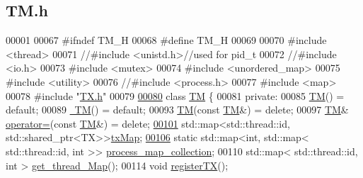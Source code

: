 \hypertarget{_t_m_8h_source}{}\subsection{T\+M.\+h}

\begin{DoxyCode}
00001 
00067 \textcolor{preprocessor}{#ifndef TM\_H}
00068 \textcolor{preprocessor}{#define TM\_H}
00069 
00070 \textcolor{preprocessor}{#include <thread>}
00071 \textcolor{comment}{//#include <unistd.h>//used for pid\_t}
00072 \textcolor{comment}{//#include <io.h>}
00073 \textcolor{preprocessor}{#include <mutex>}
00074 \textcolor{preprocessor}{#include <unordered\_map>}
00075 \textcolor{preprocessor}{#include <utility>}
00076 \textcolor{comment}{//#include <process.h>}
00077 \textcolor{preprocessor}{#include <map>}
00078 \textcolor{preprocessor}{#include "\hyperlink{_t_x_8h}{TX.h}"}
00079 
\hypertarget{_t_m_8h_source.tex_l00080}{}\hyperlink{class_t_m}{00080} \textcolor{keyword}{class }\hyperlink{class_t_m}{TM} \{
00081 \textcolor{keyword}{private}:
00085     \hyperlink{class_t_m_a9b5afb6b9d7c5925ab5cc5c65078ac23_a9b5afb6b9d7c5925ab5cc5c65078ac23}{TM}() = \textcolor{keywordflow}{default}; 
00089     \hyperlink{class_t_m_a985f8cb24f685925ddd637c7030cd2b3_a985f8cb24f685925ddd637c7030cd2b3}{~TM}() = \textcolor{keywordflow}{default};
00093     \hyperlink{class_t_m_a9b5afb6b9d7c5925ab5cc5c65078ac23_a9b5afb6b9d7c5925ab5cc5c65078ac23}{TM}(\textcolor{keyword}{const} \hyperlink{class_t_m}{TM}&) = \textcolor{keyword}{delete}; 
00097     \hyperlink{class_t_m}{TM}& \hyperlink{class_t_m_a85a6b783f0566f0877bab6a7de977c0a_a85a6b783f0566f0877bab6a7de977c0a}{operator=}(\textcolor{keyword}{const} \hyperlink{class_t_m}{TM}&) = \textcolor{keyword}{delete}; 
\hypertarget{_t_m_8h_source.tex_l00101}{}\hyperlink{class_t_m_a0333dfa193ea99d7626de74a2b932e9b_a0333dfa193ea99d7626de74a2b932e9b}{00101}     std::map<std::thread::id, std::shared\_ptr<TX>>\hyperlink{class_t_m_a0333dfa193ea99d7626de74a2b932e9b_a0333dfa193ea99d7626de74a2b932e9b}{txMap};
\hypertarget{_t_m_8h_source.tex_l00106}{}\hyperlink{class_t_m_a81c3bd28ad2343a620fa070f8ac186ca_a81c3bd28ad2343a620fa070f8ac186ca}{00106}     \textcolor{keyword}{static} std::map<int, std::map< std::thread::id, int >> 
      \hyperlink{class_t_m_a81c3bd28ad2343a620fa070f8ac186ca_a81c3bd28ad2343a620fa070f8ac186ca}{process\_map\_collection};
00110     std::map< std::thread::id, int > \hyperlink{class_t_m_afb8bc9f42fe06c52747beb7f4c46915c_afb8bc9f42fe06c52747beb7f4c46915c}{get\_thread\_Map}();
00114     \textcolor{keywordtype}{void} \hyperlink{class_t_m_a26ea481c24d9aa3aebd6dafb7253376e_a26ea481c24d9aa3aebd6dafb7253376e}{registerTX}(); 

\end{DoxyCode}
